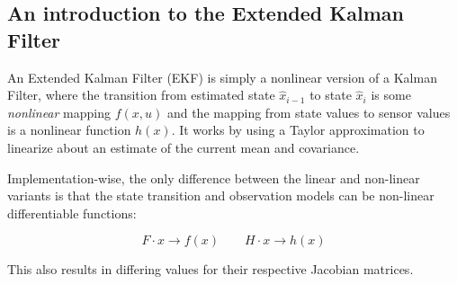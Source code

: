 \subsection{An introduction to the Extended Kalman Filter}
An Extended Kalman Filter (EKF) is simply a nonlinear version of a Kalman Filter, where the transition from estimated state $\hat{x}_{i-1}$ to state $\hat{x}_i$ is some \emph{nonlinear} mapping $f(x, u)$ and the mapping from state values to sensor values is a nonlinear function $h(x)$. It works by using a Taylor approximation to linearize about an estimate of the current mean and covariance.

Implementation-wise, the only difference between the linear and non-linear variants is that the state transition and observation models can be non-linear differentiable functions:

\[ F \cdot x \rightarrow f(x) \qquad H\cdot x \rightarrow h(x) \]

This also results in differing values for their respective Jacobian matrices.
